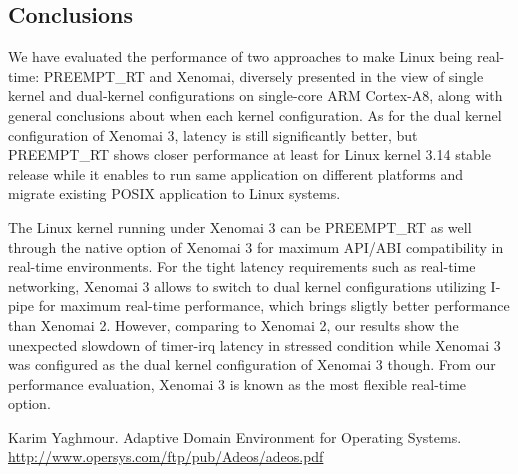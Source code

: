 \documentclass[10pt,a4paper]{article}
\begin{document}
\begin{multicols}{2}
\section{Conclusions}
We have evaluated the performance of two approaches to make Linux being real-time: PREEMPT\_RT and Xenomai, diversely presented in the view of single kernel and dual-kernel configurations on single-core ARM Cortex-A8, along with general conclusions about when each kernel configuration. As for the dual kernel configuration of Xenomai 3, latency is still significantly better, but PREEMPT\_RT shows closer performance at least for Linux kernel 3.14 stable release while it enables to run same application on different platforms and migrate existing POSIX application to Linux systems.

The Linux kernel running under Xenomai 3 can be PREEMPT\_RT as well through the native option of Xenomai 3 for maximum API/ABI compatibility in real-time environments. For the tight latency requirements such as real-time networking, Xenomai 3 allows to switch to dual kernel configurations utilizing I-pipe for maximum real-time performance, which brings sligtly better performance than Xenomai 2. However, comparing to Xenomai 2, our results show the unexpected slowdown of timer-irq latency in stressed condition while Xenomai 3 was configured as the dual kernel configuration of Xenomai 3 though. From our performance evaluation, Xenomai 3 is known as the most flexible real-time option.



\begin{thebibliography}{9}%
	 Karim Yaghmour. Adaptive Domain Environment for Operating Systems.\\
	    \url{http://www.opersys.com/ftp/pub/Adeos/adeos.pdf}
\end{thebibliography}

\end{multicols}
\end{document}
